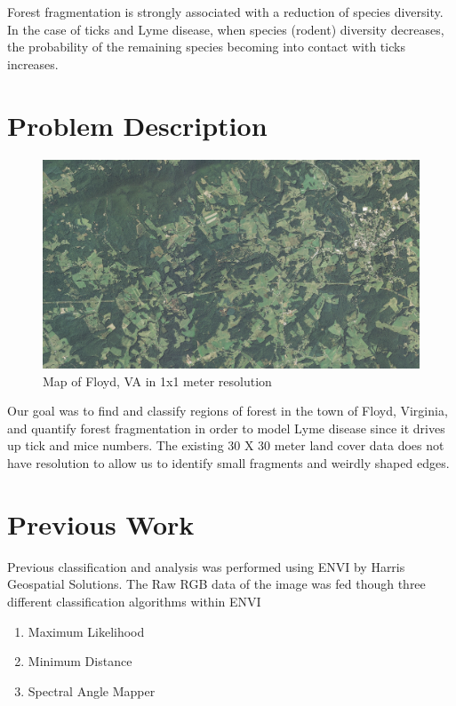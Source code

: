 \documentclass{sigkddExp}
\begin{document}
Forest fragmentation is strongly associated with a reduction of species diversity.
In the case of ticks and Lyme disease, 
when species (rodent) diversity decreases,
the probability of the remaining species becoming into contact with ticks increases.

\section{Problem Description}

\begin{figure}[hb!]
  \includegraphics[width=\linewidth]{floyd.jpg}
  \caption{Map of Floyd, VA in 1x1 meter resolution}
  \label{fig:floyd}
\end{figure}

Our goal was to find and classify regions of forest in the town of Floyd, Virginia, and quantify forest fragmentation in order to model Lyme disease since it drives up tick and mice numbers. The existing 30 X 30 meter land cover data does not have resolution to allow us to identify small fragments and weirdly shaped edges. 

\section{Previous Work}

Previous classification and analysis was performed using ENVI by Harris Geospatial Solutions.
The Raw RGB data of the image was fed though three different classification algorithms within ENVI

\begin{enumerate}
\item Maximum Likelihood
\item Minimum Distance
\item Spectral Angle Mapper
\end{enumerate}
\end{document}
